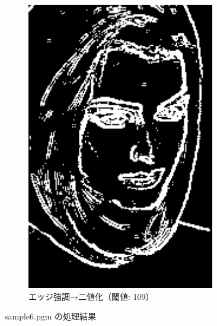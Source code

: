 \documentclass[a4paper,12pt]{jsarticle}
\begin{document}
\begin{figure}[!htbp]
\begin{subfigure}[b]{0.45\textwidth}
    \includegraphics[width=0.9\textwidth]{./images/combined_sample6_combined.png}
    \caption{エッジ強調→二値化（閾値: 109）}
\end{subfigure}
\caption{sample6.pgm の処理結果}
\label{fig:sample6}
\end{figure}
\end{document}
